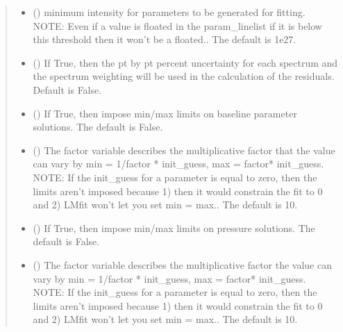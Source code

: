 \documentclass[letterpaper,10pt,english]{sphinxmanual}
\begin{document}
\begin{fulllineitems}
\begin{quote}
\begin{description}
\begin{itemize}
\item {} 
\sphinxAtStartPar
{} (\sphinxstyleliteralemphasis{\sphinxupquote{, }}) \textendash{} minimum intensity for parameters to be generated for fitting. NOTE: Even if a value is floated in the param\_linelist if it is below this threshold then it won’t be a floated.. The default is 1e\sphinxhyphen{}27.

\item {} 
\sphinxAtStartPar
{} () \textendash{} If True, then the pt by pt percent uncertainty for each spectrum and the spectrum weighting will be used in the calculation of the residuals.  Default is False.

\item {} 
\sphinxAtStartPar
{} (\sphinxstyleliteralemphasis{\sphinxupquote{, }}) \textendash{} If True, then impose min/max limits on baseline parameter solutions. The default is False.

\item {} 
\sphinxAtStartPar
{} (\sphinxstyleliteralemphasis{\sphinxupquote{, }}) \textendash{} The factor variable describes the multiplicative factor that the value can vary by min = 1/factor * init\_guess, max = factor* init\_guess. NOTE: If the init\_guess for a parameter is equal to zero, then the limits aren’t imposed because 1) then it would constrain the fit to 0 and 2) LMfit won’t let you set min = max.. The default is 10.

\item {} 
\sphinxAtStartPar
{} (\sphinxstyleliteralemphasis{\sphinxupquote{, }}) \textendash{} If True, then impose min/max limits on pressure solutions. The default is False.

\item {} 
\sphinxAtStartPar
{} (\sphinxstyleliteralemphasis{\sphinxupquote{, }}) \textendash{} The factor variable describes the multiplicative factor the value can vary by min = 1/factor * init\_guess, max = factor* init\_guess. NOTE: If the init\_guess for a parameter is equal to zero, then the limits aren’t imposed because 1) then it would constrain the fit to 0 and 2) LMfit won’t let you set min = max.. The default is 10.


\end{itemize}
\end{description}
\end{quote}
\end{fulllineitems}
\end{document}
